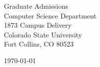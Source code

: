 \begin{minipage}{0.49\textwidth}
\begin{flushleft}
\noindent
Graduate Admissions \\
Computer Science Department \\
1873 Campus Delivery \\
Colorado State University \\
Fort Collins, CO 80523
\end{flushleft}
\end{minipage}
\begin{minipage}{0.47\textwidth}
\begin{flushright}
\today
\end{flushright}
\end{minipage} \\

\newcommand{\univ}{Colorado State University}
\newcommand{\univshort}{CSU}
\newcommand{\degree}{Ph.D.}
\newcommand{\dept}{Computer Science}